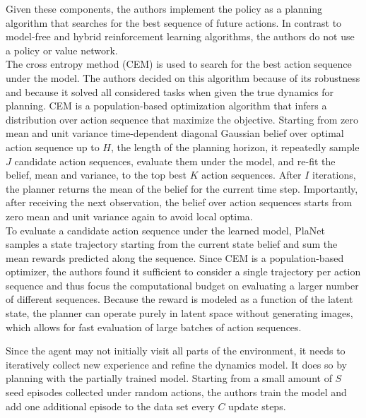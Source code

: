 Given these components, the authors implement the policy as a planning algorithm that searches for the best sequence of future actions. In contrast to model-free and hybrid reinforcement learning algorithms, the authors do not use a policy or value network. \\
The cross entropy method \cite{Algo.CEM} (CEM) is used to search for the best action sequence under the model. The authors decided on this algorithm because of its robustness and because it solved all considered tasks when given the true dynamics for planning. CEM is a population-based optimization algorithm that infers a distribution over action sequence that maximize the objective. Starting from zero mean and unit variance time-dependent diagonal Gaussian belief over optimal action sequence up to $H$, the length of the planning horizon, it repeatedly sample $J$ candidate action sequences, evaluate them under the model, and re-fit the belief, mean and variance, to the top best $K$ action sequences. After $I$ iterations, the planner returns the mean of the belief for the current time step. Importantly, after receiving the next observation, the belief over action sequences starts from zero mean and unit variance again to avoid local optima. \\
To evaluate a candidate action sequence under the learned model, PlaNet samples a state trajectory starting from the current state belief and sum the mean rewards predicted along the sequence. Since CEM is a population-based optimizer, the authors found it sufficient to consider a single trajectory per action sequence and thus focus the computational budget on evaluating a larger number of different sequences. Because the reward is modeled as a function of the latent state, the planner can operate purely in latent space without generating images, which allows for fast evaluation of large batches of action sequences.

Since the agent may not initially visit all parts of the environment, it needs to iteratively collect new experience and refine the dynamics model. It does so by planning with the partially trained model. Starting from a small amount of $S$ seed episodes collected under random actions, the authors train the model and add one additional episode to the data set every $C$ update steps.

